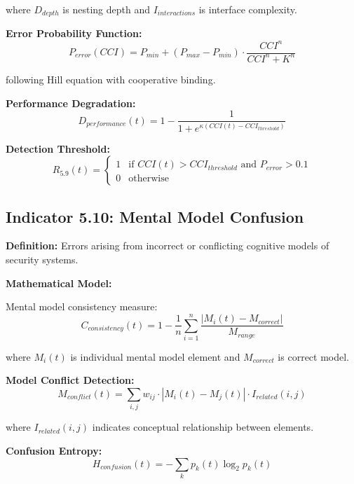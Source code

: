 \documentclass[11pt,a4paper]{article}
\begin{document}
where $D_{depth}$ is nesting depth and $I_{interactions}$ is interface complexity.

\textbf{Error Probability Function:}
\begin{equation}
P_{error}(CCI) = P_{min} + (P_{max} - P_{min}) \cdot \frac{CCI^n}{CCI^n + K^n}
\end{equation}

following Hill equation with cooperative binding.

\textbf{Performance Degradation:}
\begin{equation}
D_{performance}(t) = 1 - \frac{1}{1 + e^{\kappa(CCI(t) - CCI_{threshold})}}
\end{equation}

\textbf{Detection Threshold:}
\begin{equation}
R_{5.9}(t) = \begin{cases}
1 & \text{if } CCI(t) > CCI_{threshold} \text{ and } P_{error} > 0.1 \\
0 & \text{otherwise}
\end{cases}
\end{equation}

\subsection{Indicator 5.10: Mental Model Confusion}

\textbf{Definition:} Errors arising from incorrect or conflicting cognitive models of security systems.

\textbf{Mathematical Model:}

Mental model consistency measure:
\begin{equation}
C_{consistency}(t) = 1 - \frac{1}{n} \sum_{i=1}^{n} \frac{|M_i(t) - M_{correct}|}{M_{range}}
\end{equation}

where $M_i(t)$ is individual mental model element and $M_{correct}$ is correct model.

\textbf{Model Conflict Detection:}
\begin{equation}
M_{conflict}(t) = \sum_{i,j} w_{ij} \cdot |M_i(t) - M_j(t)| \cdot I_{related}(i,j)
\end{equation}

where $I_{related}(i,j)$ indicates conceptual relationship between elements.

\textbf{Confusion Entropy:}
\begin{equation}
H_{confusion}(t) = -\sum_k p_k(t) \log_2 p_k(t)
\end{equation}
\end{document}
